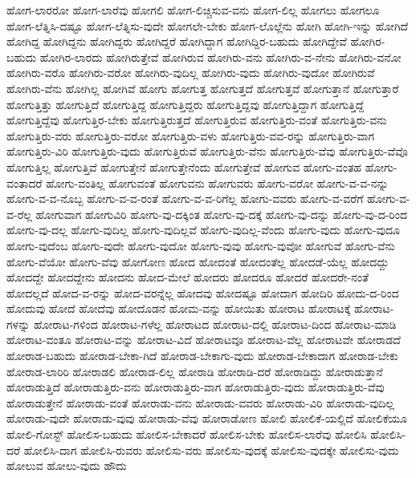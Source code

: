 {ಹೋಗ-ಲಾರರೋ
ಹೋಗ-ಲಾರೆವು
ಹೋಗಲಿ
ಹೋಗ-ಲಿಚ್ಚಿಸುವ-ವನು
ಹೋಗ-ಲಿಲ್ಲ
ಹೋಗಲು
ಹೋಗಲೂ
ಹೋಗ-ಲೆತ್ನಿಸಿ-ದಷ್ಟೂ
ಹೋಗ-ಲೆತ್ನಿಸು-ವುದೇ
ಹೋಗಲೇ-ಬೇಕು
ಹೋಗ-ಲೊಲ್ಲೆನು
ಹೋಗಿ
ಹೋಗಿ-ಇನ್ನು
ಹೋಗಿದೆ
ಹೋಗಿದ್ದ
ಹೋಗಿದ್ದನು
ಹೋಗಿದ್ದರು
ಹೋಗಿದ್ದರೆ
ಹೋಗಿದ್ದಾಗ
ಹೋಗಿದ್ದಿರ-ಬಹುದು
ಹೋಗಿದ್ದೇವೆ
ಹೋಗಿರ-ಬಹುದು
ಹೋಗಿರ-ಲಾರದು
ಹೋಗಿರುತ್ತೇವೆ
ಹೋಗಿರುವ
ಹೋಗಿರು-ವನು
ಹೋಗಿರು-ವ-ನೇನು
ಹೋಗಿರು-ವನೋ
ಹೋಗಿರು-ವರೊ
ಹೋಗಿರು-ವರೋ
ಹೋಗಿರು-ವುದಿಲ್ಲ
ಹೋಗಿರು-ವುದು
ಹೋಗಿರು-ವುದೋ
ಹೋಗಿರುವೆ
ಹೋಗಿರು-ವೆನು
ಹೋಗಿಲ್ಲ
ಹೋಗಿವೆ
ಹೋಗು
ಹೋಗುತ್ತ
ಹೋಗುತ್ತದೆ
ಹೋಗುತ್ತವೆ
ಹೋಗುತ್ತಾನೆ
ಹೋಗುತ್ತಾರೆ
ಹೋಗುತ್ತಿತ್ತು
ಹೋಗುತ್ತಿದೆ
ಹೋಗುತ್ತಿದ್ದ
ಹೋಗುತ್ತಿದ್ದರು
ಹೋಗುತ್ತಿದ್ದವು
ಹೋಗುತ್ತಿದ್ದಾಗ
ಹೋಗುತ್ತಿದ್ದೆ
ಹೋಗುತ್ತಿದ್ದೆವು
ಹೋಗುತ್ತಿರ-ಬೇಕು
ಹೋಗುತ್ತಿರುತ್ತದೆ
ಹೋಗುತ್ತಿರುವ
ಹೋಗುತ್ತಿರು-ವಂತೆ
ಹೋಗುತ್ತಿರು-ವನು
ಹೋಗುತ್ತಿರು-ವರು
ಹೋಗುತ್ತಿರು-ವರೋ
ಹೋಗುತ್ತಿರು-ವಳು
ಹೋಗುತ್ತಿರು-ವವ-ರನ್ನು
ಹೋಗುತ್ತಿರು-ವಾಗ
ಹೋಗುತ್ತಿರು-ವಿರಿ
ಹೋಗುತ್ತಿರು-ವುದು
ಹೋಗುತ್ತಿರುವೆ
ಹೋಗುತ್ತಿರು-ವೆನು
ಹೋಗುತ್ತಿರು-ವೆವು
ಹೋಗುತ್ತಿರು-ವೆವೊ
ಹೋಗುತ್ತಿಲ್ಲ
ಹೋಗುತ್ತಿವೆ
ಹೋಗುತ್ತೇನೆ
ಹೋಗುತ್ತೇನೆಂದು
ಹೋಗುತ್ತೇವೆ
ಹೋಗುವ
ಹೋಗು-ವಂತಹ
ಹೋಗು-ವಂತಾದರೆ
ಹೋಗು-ವಂತಿಲ್ಲ
ಹೋಗುವಂತೆ
ಹೋಗುವನು
ಹೋಗುವರು
ಹೋಗು-ವರೋ
ಹೋಗು-ವ-ವ-ನನ್ನು
ಹೋಗು-ವ-ವ-ನೊಬ್ಬ
ಹೋಗು-ವ-ವ-ರಂತೆ
ಹೋಗು-ವ-ವ-ರಿಗೆಲ್ಲ
ಹೋಗು-ವವರು
ಹೋಗು-ವ-ವರೆಗೆ
ಹೋಗು-ವ-ವ-ರೆಲ್ಲ
ಹೋಗುವಾಗ
ಹೋಗುವಿರಿ
ಹೋಗು-ವು-ದಕ್ಕಿಂತ
ಹೋಗು-ವು-ದಕ್ಕೆ
ಹೋಗು-ವು-ದನ್ನು
ಹೋಗು-ವು-ದ-ರಿಂದ
ಹೋಗು-ವು-ದಲ್ಲ
ಹೋಗು-ವುದಿಲ್ಲ
ಹೋಗು-ವುದಿಲ್ಲವೆ
ಹೋಗು-ವುದಿಲ್ಲ-ವೆಂದು
ಹೋಗು-ವುದು
ಹೋಗು-ವುದೂ
ಹೋಗು-ವುದೆಂಬ
ಹೋಗು-ವುದೇ
ಹೋಗು-ವುದೋ
ಹೋಗು-ವುವು
ಹೋಗು-ವುವೋ
ಹೋಗುವೆ
ಹೋಗು-ವೆನು
ಹೋಗು-ವೆಯೋ
ಹೋಗು-ವೆವು
ಹೋಗೋಣ
ಹೋದ
ಹೋದಂತೆ
ಹೋದಂತೆಲ್ಲ
ಹೋದಡೆ-ಯೆಲ್ಲ
ಹೋದದ್ದು
ಹೋದದ್ದೇ
ಹೋದದ್ದೇನು
ಹೋದನು
ಹೋದ-ಮೇಲೆ
ಹೋದರು
ಹೋದರೂ
ಹೋದರೆ
ಹೋದರೇ-ನಂತೆ
ಹೋದಲ್ಲದೆ
ಹೋದ-ವ-ರನ್ನು
ಹೋದ-ವರನ್ನೆಲ್ಲ
ಹೋದವು
ಹೋದಷ್ಟೂ
ಹೋದಾಗ
ಹೋದಿರಿ
ಹೋದು-ದ-ರಿಂದ
ಹೋದುವು
ಹೋದೆ
ಹೋದೆವು
ಹೋದೊಡನೆ
ಹೋಮ-ವನ್ನು
ಹೋಯಿತು
ಹೋರಾಟ
ಹೋರಾಟಕ್ಕೆ
ಹೋರಾಟ-ಗಳನ್ನು
ಹೋರಾಟ-ಗಳಿಂದ
ಹೋರಾಟ-ಗಳೆಲ್ಲ
ಹೋರಾಟದ
ಹೋರಾಟ-ದಲ್ಲಿ
ಹೋರಾಟ-ದಿಂದ
ಹೋರಾಟ-ಮಾಡಿ
ಹೋರಾಟ-ವಂತೂ
ಹೋರಾಟ-ವನ್ನು
ಹೋರಾಟ-ವಿದೆ
ಹೋರಾಟವೂ
ಹೋರಾಟ-ವೆಲ್ಲ
ಹೋರಾಟವೇ
ಹೋರಾಡದೆ
ಹೋರಾಡ-ಬಹುದು
ಹೋರಾಡ-ಬೇಕಾ-ಗಿದೆ
ಹೋರಾಡ-ಬೇಕಾಗು-ವುದು
ಹೋರಾಡ-ಬೇಕಾದಾಗ
ಹೋರಾಡ-ಬೇಕು
ಹೋರಾಡ-ಲಾರಿರಿ
ಹೋರಾಡಲಿ
ಹೋರಾಡ-ಲಿಲ್ಲ
ಹೋರಾಡಿ
ಹೋರಾಡಿ-ದರೆ
ಹೋರಾಡಿದ್ದು
ಹೋರಾಡುತ್ತಾನೆ
ಹೋರಾಡುತ್ತಿದೆ
ಹೋರಾಡುತ್ತಿರು-ವನು
ಹೋರಾಡುತ್ತಿರು-ವಾಗ
ಹೋರಾಡುತ್ತಿರು-ವುದು
ಹೋರಾಡುತ್ತಿರು-ವೆವು
ಹೋರಾಡುತ್ತೇನೆ
ಹೋರಾಡು-ವಂತೆ
ಹೋರಾಡು-ವನು
ಹೋರಾಡು-ವವರು
ಹೋರಾಡು-ವಿರಿ
ಹೋರಾಡು-ವುದಿಲ್ಲ
ಹೋರಾಡು-ವುದೇ
ಹೋರಾಡು-ವುವು
ಹೋರಾಡು-ವೆವು
ಹೋರಾಡೋಣ
ಹೋಲಿ
ಹೋಲಿಕೆ-ಯಲ್ಲಿದೆ
ಹೋಲಿಕೆಯೂ
ಹೋಲಿ-ಗೋಸ್ಟ್
ಹೋಲಿಸ-ಬಹುದು
ಹೋಲಿಸ-ಬೇಕಾದರೆ
ಹೋಲಿಸ-ಬೇಕು
ಹೋಲಿಸ-ಲಾರೆವು
ಹೋಲಿಸಿ
ಹೋಲಿಸಿ-ದರೆ
ಹೋಲಿಸಿ-ದಾಗ
ಹೋಲಿಸಿ-ರುವರು
ಹೋಲಿಸು-ವರು
ಹೋಲಿಸು-ವುದಕ್ಕೆ
ಹೋಲಿಸು-ವುದಕ್ಕೇ
ಹೋಲಿಸು-ವುದು
ಹೋಲುವ
ಹೋಲು-ವುದು
ಹೌದು
}
